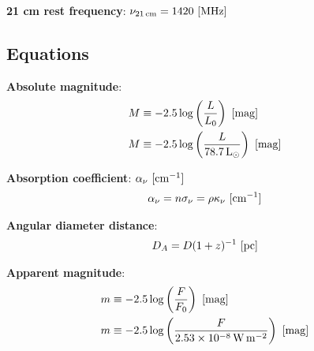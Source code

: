 \documentclass[a4paper,11pt]{article}
\begin{document}
{\noindent}\textbf{21 cm rest frequency}: $\nu_{21\,\mathrm{cm}} = 1420 ~ [{\rm MHz}]$







































\newpage
\subsection{Equations}

{\noindent}\textbf{Absolute magnitude}:
\begin{align*}
    M &\equiv -2.5\log\left(\frac{L}{L_0}\right) ~ [{\rm mag}] \\
    M &\equiv -2.5\log\left(\frac{L}{78.7\,{\rm L_\odot}}\right) ~ [{\rm mag}]
\end{align*}

{\noindent}\textbf{Absorption coefficient}: $\alpha_\nu ~ [{\rm cm^{-1}}]$
\begin{align*}
    \alpha_\nu = n\sigma_\nu = \rho\kappa_\nu ~ [{\rm cm^{-1}}]
\end{align*}

{\noindent}\textbf{Angular diameter distance}:
\begin{align*}
    D_A = D(1+z)^{-1} ~ [{\rm pc}]
\end{align*}

{\noindent}\textbf{Apparent magnitude}:
\begin{align*}
     m &\equiv -2.5\log\left(\frac{F}{F_0}\right) ~ [{\rm mag}] \\
     m &\equiv -2.5\log\left(\frac{F}{2.53\times10^{-8}\,{\rm W\,m^{-2}}}\right) ~ [{\rm mag}]
\end{align*}
\end{document}
